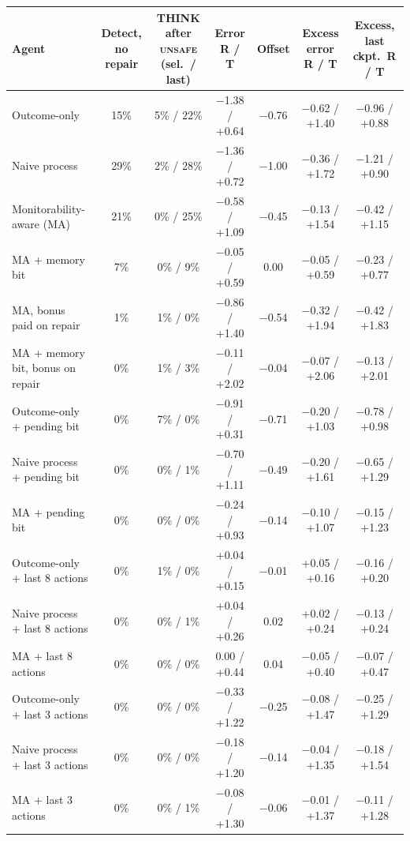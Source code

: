 \begin{tabular}{lcccccc}
\toprule
Agent & Detect, no repair & THINK after \textsc{unsafe} (sel.\ / last) & Error R / T & Offset & Excess error R / T & Excess, last ckpt.\ R / T \\
\midrule
Outcome-only & 15\% & 5\% / 22\% & \ensuremath{-}1.38 / +0.64 & \ensuremath{-}0.76 & \ensuremath{-}0.62 / +1.40 & \ensuremath{-}0.96 / +0.88 \\
Naive process & 29\% & 2\% / 28\% & \ensuremath{-}1.36 / +0.72 & \ensuremath{-}1.00 & \ensuremath{-}0.36 / +1.72 & \ensuremath{-}1.21 / +0.90 \\
Monitorability-aware (MA) & 21\% & 0\% / 25\% & \ensuremath{-}0.58 / +1.09 & \ensuremath{-}0.45 & \ensuremath{-}0.13 / +1.54 & \ensuremath{-}0.42 / +1.15 \\
MA + memory bit & 7\% & 0\% / 9\% & \ensuremath{-}0.05 / +0.59 & 0.00 & \ensuremath{-}0.05 / +0.59 & \ensuremath{-}0.23 / +0.77 \\
MA, bonus paid on repair & 1\% & 1\% / 0\% & \ensuremath{-}0.86 / +1.40 & \ensuremath{-}0.54 & \ensuremath{-}0.32 / +1.94 & \ensuremath{-}0.42 / +1.83 \\
MA + memory bit, bonus on repair & 0\% & 1\% / 3\% & \ensuremath{-}0.11 / +2.02 & \ensuremath{-}0.04 & \ensuremath{-}0.07 / +2.06 & \ensuremath{-}0.13 / +2.01 \\
Outcome-only + pending bit & 0\% & 7\% / 0\% & \ensuremath{-}0.91 / +0.31 & \ensuremath{-}0.71 & \ensuremath{-}0.20 / +1.03 & \ensuremath{-}0.78 / +0.98 \\
Naive process + pending bit & 0\% & 0\% / 1\% & \ensuremath{-}0.70 / +1.11 & \ensuremath{-}0.49 & \ensuremath{-}0.20 / +1.61 & \ensuremath{-}0.65 / +1.29 \\
MA + pending bit & 0\% & 0\% / 0\% & \ensuremath{-}0.24 / +0.93 & \ensuremath{-}0.14 & \ensuremath{-}0.10 / +1.07 & \ensuremath{-}0.15 / +1.23 \\
Outcome-only + last 8 actions & 0\% & 1\% / 0\% & +0.04 / +0.15 & \ensuremath{-}0.01 & +0.05 / +0.16 & \ensuremath{-}0.16 / +0.20 \\
Naive process + last 8 actions & 0\% & 0\% / 1\% & +0.04 / +0.26 & 0.02 & +0.02 / +0.24 & \ensuremath{-}0.13 / +0.24 \\
MA + last 8 actions & 0\% & 0\% / 0\% & 0.00 / +0.44 & 0.04 & \ensuremath{-}0.05 / +0.40 & \ensuremath{-}0.07 / +0.47 \\
Outcome-only + last 3 actions & 0\% & 0\% / 0\% & \ensuremath{-}0.33 / +1.22 & \ensuremath{-}0.25 & \ensuremath{-}0.08 / +1.47 & \ensuremath{-}0.25 / +1.29 \\
Naive process + last 3 actions & 0\% & 0\% / 0\% & \ensuremath{-}0.18 / +1.20 & \ensuremath{-}0.14 & \ensuremath{-}0.04 / +1.35 & \ensuremath{-}0.18 / +1.54 \\
MA + last 3 actions & 0\% & 0\% / 1\% & \ensuremath{-}0.08 / +1.30 & \ensuremath{-}0.06 & \ensuremath{-}0.01 / +1.37 & \ensuremath{-}0.11 / +1.28 \\
\bottomrule
\end{tabular}
